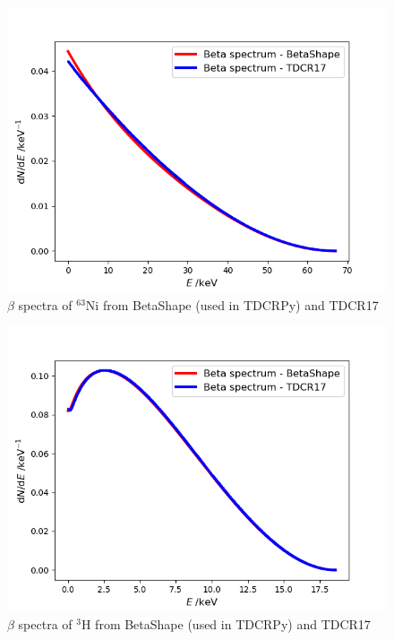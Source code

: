 \documentclass[12pt]{iopart}
\begin{document}
\begin{figure}[h!]
\centering
\includegraphics[scale=0.4]{../decayData/spectra/BetaSpectrum_Ni-63.png}
\caption{$\beta$ spectra of $^{63}$Ni from BetaShape (used in TDCRPy) and TDCR17}
\label{fig:Ni-63}
\end{figure}

\begin{figure}[h!]
\centering
\includegraphics[scale=0.4]{../decayData/spectra/BetaSpectrum_H-3.png}
\caption{$\beta$ spectra of $^{3}$H from BetaShape (used in TDCRPy) and TDCR17}
\label{fig:H-3}
\end{figure}
\end{document}
